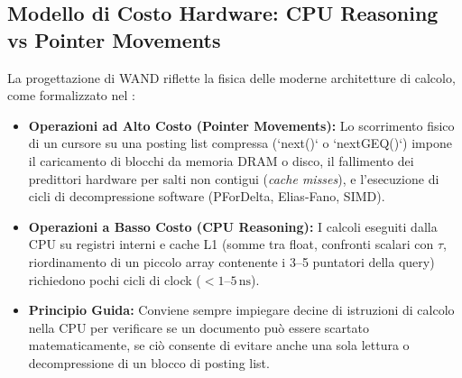 \FloatBarrier
\subsection{Modello di Costo Hardware: CPU Reasoning vs Pointer Movements}
La progettazione di WAND riflette la fisica delle moderne architetture di calcolo, come formalizzato nel :
\begin{itemize}
    \item \textbf{Operazioni ad Alto Costo (Pointer Movements):} Lo scorrimento fisico di un cursore su una posting list compressa (`next()` o `nextGEQ()`) impone il caricamento di blocchi da memoria DRAM o disco, il fallimento dei predittori hardware per salti non contigui (\textit{cache misses}), e l'esecuzione di cicli di decompressione software (PForDelta, Elias-Fano, SIMD).
    \item \textbf{Operazioni a Basso Costo (CPU Reasoning):} I calcoli eseguiti dalla CPU su registri interni e cache L1 (somme tra float, confronti scalari con $\tau$, riordinamento di un piccolo array contenente i 3--5 puntatori della query) richiedono pochi cicli di clock ($< 1\text{--}5\,\text{ns}$).
    \item \textbf{Principio Guida:} Conviene sempre impiegare decine di istruzioni di calcolo nella CPU per verificare se un documento pu\`o essere scartato matematicamente, se ci\`o consente di evitare anche una sola lettura o decompressione di un blocco di posting list.
\end{itemize}

\FloatBarrier
